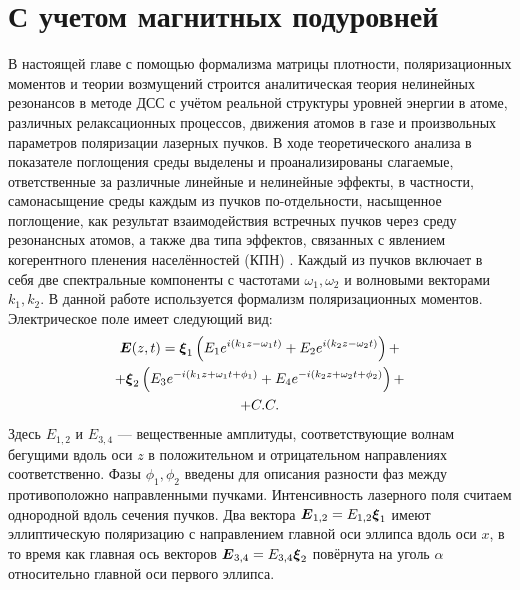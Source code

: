 \chapter{С учетом магнитных подуровней}\label{ch:ch2}
В настоящей главе с помощью формализма матрицы плотности, поляризационных моментов и теории возмущений строится аналитическая теория нелинейных резонансов в методе ДСС с учётом реальной структуры уровней энергии в атоме, различных релаксационных процессов, движения атомов в газе и произвольных параметров поляризации лазерных пучков.
В ходе теоретического анализа в показателе поглощения среды выделены и проанализированы слагаемые, ответственные за различные линейные и нелинейные эффекты, в частности, самонасыщение среды каждым из пучков по-отдельности, насыщенное поглощение, как результат взаимодействия встречных пучков через среду резонансных атомов, а также два типа эффектов, связанных с явлением когерентного пленения населённостей (КПН) \cite{Arimondo1996,Smirnov1989}.
Каждый из пучков включает в себя две спектральные компоненты с частотами $\omega_1,\omega_2$ и волновыми векторами $k_1,k_2$.
В данной работе используется формализм поляризационных моментов. Электрическое поле имеет следующий вид:
\begin{multline} \label{eqn:field}
    \boldsymbol{E}(z,t)=\boldsymbol{\xi}_1
        \left(
            E_1e^{i(k_1z-\omega_1t)}+E_2e^{i(k_2z-\omega_2t)}
        \right)+\\+
    \boldsymbol{\xi}_2
        \left(
            E_3e^{-i(k_1z+\omega_1t+\phi_1)}+E_4e^{-i(k_2z+\omega_2t+\phi_2)}
        \right)+\\+C.C.
\end{multline}
Здесь $E_{1,2}$ и $E_{3,4}$ --- вещественные амплитуды, соответствующие волнам бегущими вдоль оси $z$ в положительном и отрицательном направлениях соответственно. Фазы $\phi_1, \phi_2$ введены для описания разности фаз между противоположно направленными пучками. 
Интенсивность лазерного поля считаем однородной вдоль сечения пучков.
Два вектора $\boldsymbol{E}_{1,2}=E_{1,2}\boldsymbol{\xi}_{1}$ имеют эллиптическую поляризацию с направлением главной оси эллипса вдоль оси $x$, в то время как главная ось векторов $\boldsymbol{E}_{3,4}=E_{3,4}\boldsymbol{\xi}_{2}$ повёрнута на уголь $\alpha$ относительно главной оси первого эллипса. 

